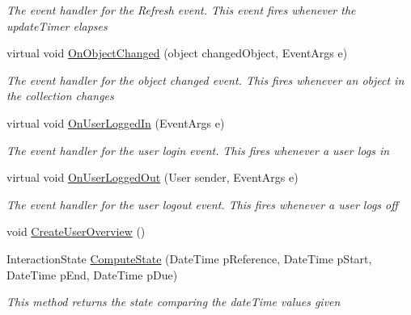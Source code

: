 \begin{DoxyCompactItemize}
\begin{DoxyCompactList}\small\item\em The event handler for the Refresh event. This event fires whenever the update\+Timer elapses \end{DoxyCompactList}\item 
virtual void \hyperlink{class_plex_byte_1_1_mo_cap_1_1_managers_1_1_object_manager_a6b71a2212ad5f2f2af2f07c5abd702d3}{On\+Object\+Changed} (object changed\+Object, Event\+Args e)
\begin{DoxyCompactList}\small\item\em The event handler for the object changed event. This fires whenever an object in the collection changes \end{DoxyCompactList}\item 
virtual void \hyperlink{class_plex_byte_1_1_mo_cap_1_1_managers_1_1_object_manager_a2a66ae80bfc13cbdcc354d0b490daf5b}{On\+User\+Logged\+In} (Event\+Args e)
\begin{DoxyCompactList}\small\item\em The event handler for the user login event. This fires whenever a user logs in \end{DoxyCompactList}\item 
virtual void \hyperlink{class_plex_byte_1_1_mo_cap_1_1_managers_1_1_object_manager_a979a125bdcae5c7169eec97807de5e75}{On\+User\+Logged\+Out} (User sender, Event\+Args e)
\begin{DoxyCompactList}\small\item\em The event handler for the user logout event. This fires whenever a user logs off \end{DoxyCompactList}\item 
void \hyperlink{class_plex_byte_1_1_mo_cap_1_1_managers_1_1_object_manager_a9f2052967a6a2bd04d4887ad10dba10b}{Create\+User\+Overview} ()
\item 
Interaction\+State \hyperlink{class_plex_byte_1_1_mo_cap_1_1_managers_1_1_object_manager_ad470277f7326e10824b5c8da0574ab60}{Compute\+State} (Date\+Time p\+Reference, Date\+Time p\+Start, Date\+Time p\+End, Date\+Time p\+Due)
\begin{DoxyCompactList}\small\item\em This method returns the state comparing the date\+Time values given \end{DoxyCompactList}\end{DoxyCompactItemize}
